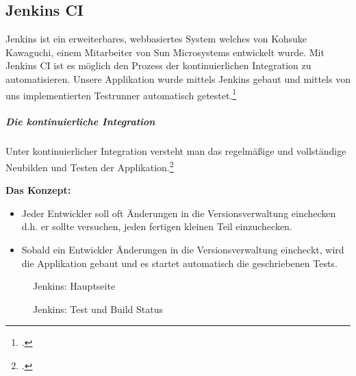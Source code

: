 
\subsection{Jenkins CI}
Jenkins ist ein erweiterbares, webbasiertes System welches von Kohsuke Kawaguchi, einem Mitarbeiter von Sun Microsystems entwickelt wurde. Mit Jenkins CI ist es möglich den  Prozess der kontinuierlichen Integration zu automatisieren.
Unsere Applikation wurde mittels Jenkins gebaut und mittels von uns implementierten Testrunner automatisch getestet.\footcite[vgl.][]{jenkins}

\subparagraph{Die kontinuierliche Integration}

Unter kontinuierlicher Integration versteht man das regelmäßige und vollständige Neubilden und Testen der Applikation.\footcite[vgl.][]{ci}
 
\textbf{Das Konzept:}
\begin{itemize}
\item Jeder Entwickler soll oft Änderungen in die Versionsverwaltung einchecken d.h. er sollte versuchen, jeden fertigen kleinen Teil einzuchecken. 
\item Sobald ein Entwickler Änderungen in die Versionsverwaltung eincheckt, wird die Applikation gebaut und es startet automatisch die geschriebenen Tests.
\end{itemize}

\begin{figure}[htbp]
  \centering
  \begin{minipage}[t]{7 cm}
    \caption{Jenkins: Hauptseite}
  \end{minipage}
  \hspace{0.5cm}
  \begin{minipage}[t]{7 cm}
    \caption{Jenkins: Test und Build Status}
  \end{minipage}
  
\end{figure}